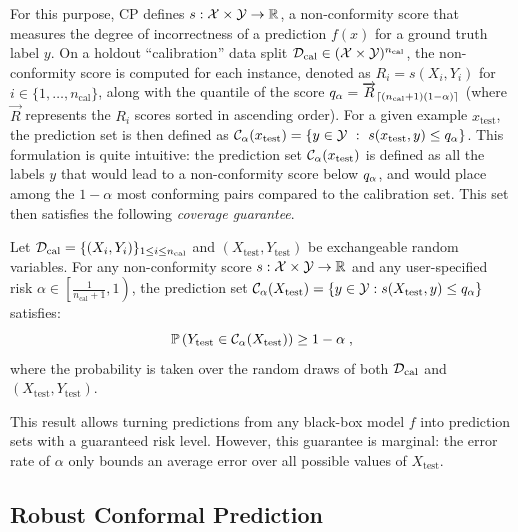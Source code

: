 For this purpose, CP defines $s : \mathcal{X} \times \mathcal{Y} \rightarrow \mathbb{R}$, a non-conformity score that measures the degree of incorrectness of a prediction $f(x)$ for a ground truth label $y$. On a holdout ``calibration'' data split $\mathcal{D}_\mathrm{cal} \in ( \mathcal{X} \times \mathcal{Y})^{n_\mathrm{cal}}$, the non-conformity score is computed for each instance, denoted as $R_i=s(X_i, Y_i)$ for $i\in\{1,\dots,n_\mathrm{cal}\}$, along with the quantile of the score $q_{\alpha}=\overrightarrow{R}_{\lceil (n_\mathrm{cal}+1)(1-\alpha)\rceil}$ (where $\overrightarrow{R}$ represents the $R_i$ scores sorted in ascending order). For a given example $x_\mathrm{test}$, the prediction set is then defined as $\mathcal{C}_{\alpha}(x_\mathrm{test})=\{ y \in \mathcal{Y} \ : \ s(x_\mathrm{test},y) \leq q_{\alpha} \}$. This formulation is quite intuitive: the prediction set $\mathcal{C}_{\alpha}(x_\mathrm{test})$ is defined as all the labels $y$ that would lead to a non-conformity score below $q_{\alpha}$, and would place among the $1-\alpha$ most conforming pairs compared to the calibration set. This set then satisfies the following \emph{coverage guarantee}.
%
\begin{theorem}
\label{thm:vovk}
    Let $\mathcal{D}_\mathrm{cal} = \{ (X_i,Y_i) \}_{1 \leq i \leq n_\mathrm{cal}}$ and $(X_\mathrm{test},Y_\mathrm{test})$ be exchangeable random variables. For any non-conformity score $s : \mathcal{X} \times \mathcal{Y} \rightarrow \mathbb{R}$ and any user-specified risk $\alpha\in\left[\frac{1}{n_\mathrm{cal}+1},1\right)$, the prediction set $\mathcal{C}_{\alpha}(X_\mathrm{test}) = \{y \in \mathcal{Y}: s(X_\mathrm{test},y) \leq q_{\alpha} \}$ satisfies:
    \begin{equation}
        \mathbb{P} \left(Y_\mathrm{test} \in \mathcal{C}_{\alpha}(X_\mathrm{test}) \right) \geq 1 - \alpha \;,
    \end{equation}
where the probability is taken over the random draws of both $\mathcal{D}_\mathrm{cal}$ and $(X_\mathrm{test},Y_\mathrm{test})$.
\end{theorem}

This result allows turning predictions from any black-box model $f$ into prediction sets with a guaranteed risk level. However, this guarantee is marginal: the error rate of $\alpha$ only bounds an average error over all possible values of $X_\mathrm{test}$.


\subsection{Robust Conformal Prediction}
\label{sec:robustCP-relatedworks}

